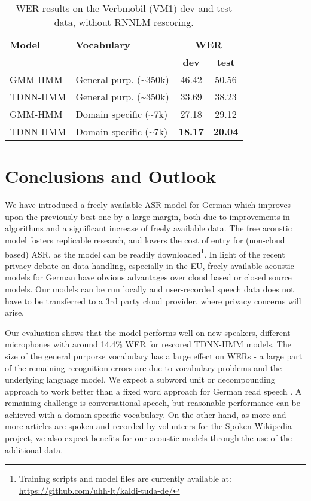 \documentclass[a4paper]{article}
\begin{document}
\begin{table}[t]
  \centering
  \begin{tabular}{llcc}
    \toprule
\textbf{Model} & \textbf{Vocabulary} &    \multicolumn{2}{c}{\textbf{WER}} \\ 
              &      & \textbf{dev} & \textbf{test} \\  
    \midrule    
GMM-HMM & General purp. (\textasciitilde 350k) & 46.42 & 50.56 \\   
    TDNN-HMM & General purp. (\textasciitilde 350k) & 33.69  & 38.23  \\
    \midrule
GMM-HMM & Domain specific (\textasciitilde 7k) & 27.18 & 29.12 \\   
    TDNN-HMM & Domain specific (\textasciitilde 7k) & \textbf{18.17}  & \textbf{20.04}  \\
    \bottomrule
  \end{tabular}
  \caption{WER results on the Verbmobil (VM1) dev and test data, without RNNLM rescoring.}
  \label{tab:vmresults}
  \vspace{-3mm}
\end{table}

\section{Conclusions and Outlook}
\label{sec:conclusions-outlook}

We have introduced a freely available ASR model for German which
improves upon the previously best one by a large margin, both due to
improvements in algorithms and a significant increase of freely
available data.
The free acoustic model fosters replicable research, and lowers the
cost of entry for (non-cloud based) ASR, as the model can be
readily downloaded\footnote{Training scripts and model files are currently available at: \\ \url{https://github.com/uhh-lt/kaldi-tuda-de/}}. In light of the recent privacy debate on data handling, especially in the EU, freely available acoustic models for German have obvious advantages over cloud based or closed source models. Our models can be run locally and user-recorded speech data does not have to be transferred to a 3rd party cloud provider, where privacy concerns will arise.

Our evaluation shows that the model performs well on new speakers, different microphones with around 14.4\% WER for rescored TDNN-HMM models. The size of the general purporse vocabulary has a large effect on WERs - a large part of the remaining recognition errors are due to vocabulary problems and the underlying language model. We expect a subword unit or decompounding approach to work better than a fixed word approach for German read speech \cite{smit2017improved}. A remaining challenge is conversational speech, but reasonable performance can be achieved with a domain specific vocabulary. On the other hand, as more and more articles are spoken and recorded by volunteers for the Spoken Wikipedia project, we also expect benefits for our acoustic models through the use of the additional data.
\end{document}
